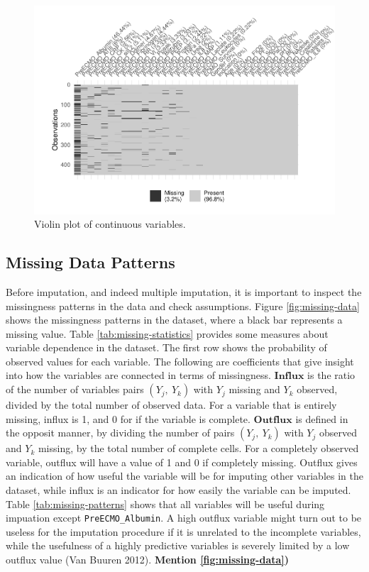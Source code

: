 \documentclass[12pt,]{article}
\begin{document}
\begin{figure}[H]

{\centering \includegraphics[width=1\linewidth]{figure/graphics-unnamed-chunk-6-1} 

}

\caption{\label{fig:violin-standardized}Violin plot of continuous variables.}\label{fig:unnamed-chunk-6}
\end{figure}

\subsection{Missing Data Patterns}\label{missing-data-patterns}

Before imputation, and indeed multiple imputation, it is important to
inspect the missingness patterns in the data and check assumptions.
Figure \ref{fig:missing-data} shows the missingness patterns in the
dataset, where a black bar represents a missing value. Table
\ref{tab:missing-statistics} provides some measures about variable
dependence in the dataset. The first row shows the probability of
observed values for each variable. The following are coefficients that
give insight into how the variables are connected in terms of
missingness. \(\mathbf{Influx}\) is the ratio of the number of variables
pairs \((Y_j, ~Y_k)\) with \(Y_j\) missing and \(Y_k\) observed, divided
by the total number of observed data. For a variable that is entirely
missing, influx is 1, and 0 for if the variable is complete.
\(\mathbf{Outflux}\) is defined in the opposit manner, by dividing the
number of pairs \((Y_j, ~Y_k)\) with \(Y_j\) observed and \(Y_k\)
missing, by the total number of complete cells. For a completely
observed variable, outflux will have a value of 1 and 0 if completely
missing. Outflux gives an indication of how useful the variable will be
for imputing other variables in the dataset, while influx is an
indicator for how easily the variable can be imputed. Table
\ref{tab:missing-patterns} shows that all variables will be useful
during impuation except \texttt{PreECMO\_Albumin}. A high outflux
variable might turn out to be useless for the imputation procedure if it
is unrelated to the incomplete variables, while the usefulness of a
highly predictive variables is severely limited by a low outflux value
(Van Buuren 2012). \textbf{Mention \ref{fig:missing-data})}
\end{document}
